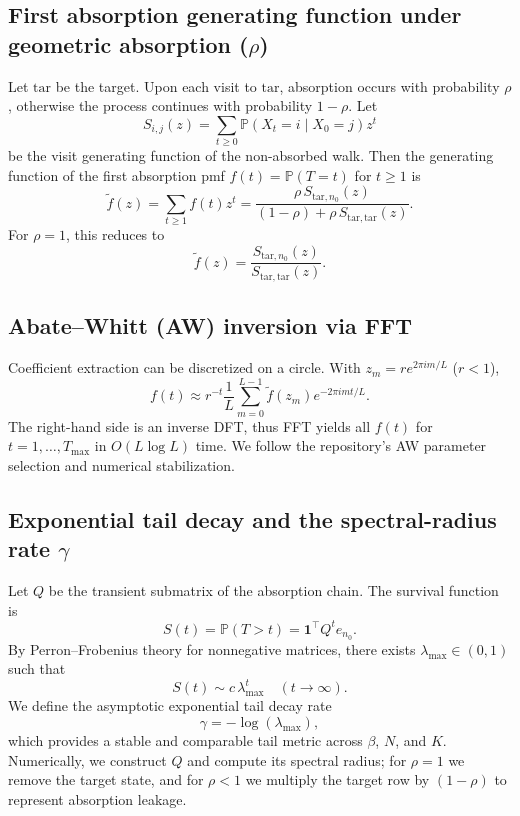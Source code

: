 \subsection{First absorption generating function under geometric absorption (\texorpdfstring{$\rho$}{rho})}
Let $\mathrm{tar}$ be the target. Upon each visit to $\mathrm{tar}$, absorption occurs with probability $\rho$, otherwise the process continues with probability $1-\rho$.
Let
\[
S_{i,j}(z)=\sum_{t\ge 0}\mathbb{P}(X_t=i\mid X_0=j)z^t
\]
be the visit generating function of the non-absorbed walk. Then the generating function of the first absorption pmf $f(t)=\mathbb{P}(T=t)$ for $t\ge 1$ is
\begin{equation}
\tilde f(z)=\sum_{t\ge 1}f(t)z^t
=\frac{\rho\,S_{\mathrm{tar},n_0}(z)}{(1-\rho)+\rho\,S_{\mathrm{tar},\mathrm{tar}}(z)}.
\end{equation}
For $\rho=1$, this reduces to
\[
\tilde f(z)=\frac{S_{\mathrm{tar},n_0}(z)}{S_{\mathrm{tar},\mathrm{tar}}(z)}.
\]

\subsection{Abate--Whitt (AW) inversion via FFT}
Coefficient extraction can be discretized on a circle. With $z_m=re^{2\pi i m/L}$ ($r<1$),
\begin{equation}
f(t)\approx r^{-t}\frac{1}{L}\sum_{m=0}^{L-1}\tilde f(z_m)e^{-2\pi i mt/L}.
\end{equation}
The right-hand side is an inverse DFT, thus FFT yields all $f(t)$ for $t=1,\dots,T_{\max}$ in $O(L\log L)$ time. We follow the repository's AW parameter selection and numerical stabilization.

\subsection{Exponential tail decay and the spectral-radius rate \texorpdfstring{$\gamma$}{gamma}}
Let $Q$ be the transient submatrix of the absorption chain. The survival function is
\[
S(t)=\mathbb{P}(T>t)=\mathbf{1}^\top Q^t e_{n_0}.
\]
By Perron--Frobenius theory for nonnegative matrices, there exists $\lambda_{\max}\in(0,1)$ such that
\[
S(t)\sim c\,\lambda_{\max}^t\quad (t\to\infty).
\]
We define the asymptotic exponential tail decay rate
\begin{equation}
\gamma=-\log(\lambda_{\max}),
\end{equation}
which provides a stable and comparable tail metric across $\beta$, $N$, and $K$. Numerically, we construct $Q$ and compute its spectral radius; for $\rho=1$ we remove the target state, and for $\rho<1$ we multiply the target row by $(1-\rho)$ to represent absorption leakage.
